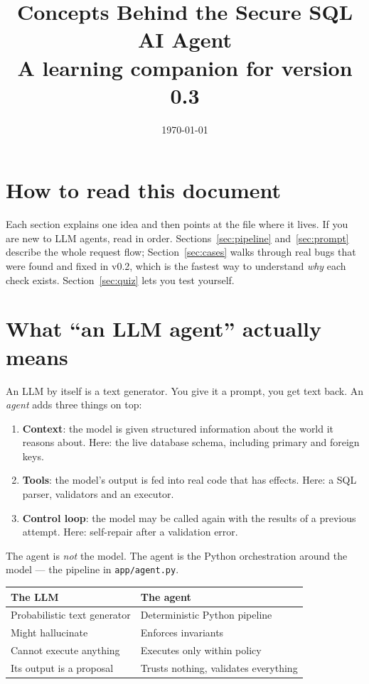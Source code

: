 \documentclass[11pt,a4paper]{article}
\title{\textbf{Concepts Behind the Secure SQL AI Agent}\\[4pt]
       \large A learning companion for version 0.3}
\author{}
\date{\today}
\begin{document}
\sloppy
\maketitle
\tableofcontents
\newpage

\section*{How to read this document}

Each section explains one idea and then points at the file where it lives.
If you are new to LLM agents, read in order. Sections~\ref{sec:pipeline}
and~\ref{sec:prompt} describe the whole request flow; Section~\ref{sec:cases}
walks through real bugs that were found and fixed in v0.2, which is the
fastest way to understand \emph{why} each check exists. Section~\ref{sec:quiz}
lets you test yourself.

\section{What ``an LLM agent'' actually means}

An LLM by itself is a text generator. You give it a prompt, you get text back.
An \emph{agent} adds three things on top:

\begin{enumerate}[leftmargin=*]
  \item \textbf{Context}: the model is given structured information about the
        world it reasons about. Here: the live database schema, including
        primary and foreign keys.
  \item \textbf{Tools}: the model's output is fed into real code that has
        effects. Here: a SQL parser, validators and an executor.
  \item \textbf{Control loop}: the model may be called again with the results
        of a previous attempt. Here: self-repair after a validation error.
\end{enumerate}

The agent is \emph{not} the model. The agent is the Python orchestration
around the model --- the pipeline in \texttt{app/agent.py}.

\begin{center}
\begin{tabular}{@{}ll@{}}
\toprule
\textbf{The LLM} & \textbf{The agent} \\
\midrule
Probabilistic text generator & Deterministic Python pipeline \\
Might hallucinate            & Enforces invariants \\
Cannot execute anything      & Executes only within policy \\
Its output is a proposal     & Trusts nothing, validates everything \\
\bottomrule
\end{tabular}
\end{center}
\end{document}
